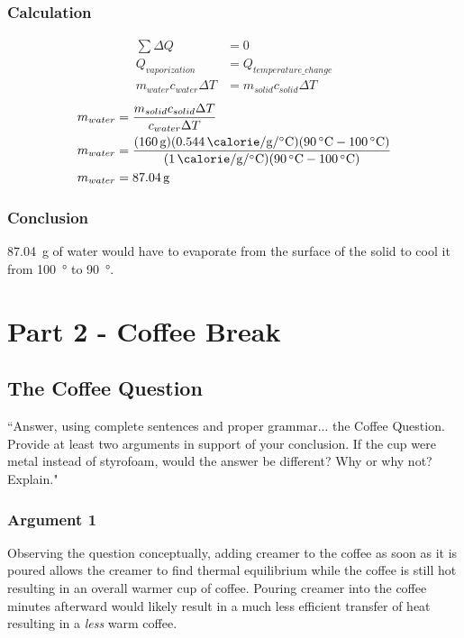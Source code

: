 \documentclass{article}
\begin{document}
\subsubsection{Calculation}

\begin{align*}
	\sum \Delta Q & = 0 \\
	Q_{vaporization} & = Q_{temperature\_change} \\
	m_{water}c_{water}\Delta T & = m_{solid}c_{solid}\Delta T
\end{align*}
\begin{align*}
	m_{water} & = \frac{ m_{solid}c_{solid}\Delta T }{ c_{water}\Delta T } \\
	m_{water} & = \frac{ (\SI{160}{\gram})(\SI{0.544}{\calorie \per \gram \per \celsius})(\SI{90}{\celsius} - \SI{100}{\celsius}) }{ (\SI{1}{\calorie \per \gram \per \celsius})(\SI{90}{\celsius} - \SI{100}{\celsius}) } \\
	m_{water} & = \SI{87.04}{\gram}
\end{align*}

\subsubsection{Conclusion}

\SI{87.04}{\gram} of water would have to evaporate from the surface of the solid to cool it from \SI{100}{\degree} to \SI{90}{\degree}.

\section{Part 2 - Coffee Break}

\subsection{The Coffee Question}

``Answer, using complete sentences and proper grammar... the Coffee Question. Provide at least two arguments in support of your conclusion. If the cup were metal instead of styrofoam, would the answer be different? Why or why not? Explain."

\subsubsection{Argument 1}

Observing the question conceptually, adding creamer to the coffee as soon as it is poured allows the creamer to find thermal equilibrium while the coffee is still hot resulting in an overall warmer cup of coffee. Pouring creamer into the coffee minutes afterward would likely result in a much less efficient transfer of heat resulting in a \textit{less} warm coffee.
\end{document}
